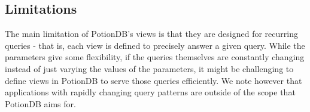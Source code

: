 \documentclass[sigconf, nonacm]{acmart}
\begin{document}

\subsection{Limitations}	%
\label{subsec:limitations}

The main limitation of PotionDB's views is that they are designed for recurring queries - that is, each view is defined to precisely answer a given query.
While the parameters give some flexibility, if the queries themselves are constantly changing instead of just varying the values of the parameters, it might be challenging to define views in PotionDB to serve those queries efficiently.
We note however that applications with rapidly changing query patterns are outside of the scope that PotionDB aims for.
\end{document}
